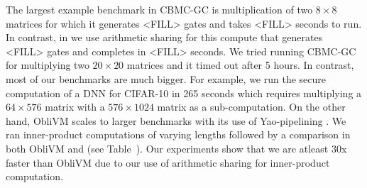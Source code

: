 The largest example benchmark in CBMC-GC is multiplication of two $8\times 8$ matrices for which it generates <FILL> gates and takes <FILL> seconds to run. In contrast, in \tool we use arithmetic sharing for this compute that generates <FILL> gates and completes in <FILL> seconds. We tried running CBMC-GC for multiplying two $20\times 20$ matrices and it timed out after 5 hours. In contrast, most of our benchmarks are much bigger. For example, we run the secure computation of a DNN for CIFAR-10 in 265 seconds which requires multiplying a $64\times576$ matrix with a $576\times1024$ matrix as a sub-computation. On the other hand, ObliVM scales to larger benchmarks with its use of Yao-pipelining \cite{yao-pipe}. We ran inner-product computations of varying lengths followed by a comparison in both ObliVM and \tool (see Table~\cite{oblivm-compare}). Our experiments show that we are atleast 30x faster than ObliVM due to our use of arithmetic sharing for inner-product computation. 


